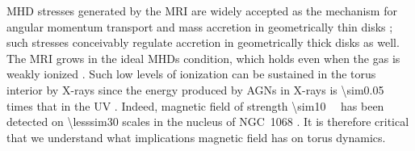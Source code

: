 \documentclass[twocolumn]{article}
\newcommand*\xray{\texorpdfstring{X\protect\nobreakdash-ray}{X-ray}}
\newcommand*\xrays{\xray s}
\begin{document}

\Ac{MHD} stresses generated by the \ac{MRI} are widely accepted as the
mechanism for angular momentum transport and mass accretion in geometrically
thin disks \citep[e.g.,][]{1991ApJ...376..214B, 1991ApJ...376..223H}; such
stresses conceivably regulate accretion in geometrically thick disks as well.
The \ac{MRI} grows in the ideal \acp{MHD} condition, which holds even when the
gas is weakly ionized \citep{1994ApJ...421..163B, 1996ApJ...457..355G}. Such
low levels of ionization can be sustained in the torus interior by \xrays{}
\citep{1995ApJ...447L..17N} since the energy produced by \acp{AGN} in \xrays{}
is \num{\sim0.05} times that in the \ac{UV}
\citep[e.g.,][]{1981ApJ...245..357Z}. Indeed, magnetic field of strength
\SI{\sim10}{\milli\gauss} has been detected on \SI{\lesssim30}{\parsec} scales
in the nucleus of \ac{NGC}~1068 \citep{2015MNRAS.452.1902L}. It is therefore
critical that we understand what implications magnetic field has on torus
dynamics.
\end{document}
